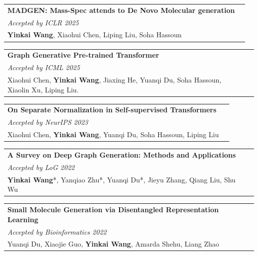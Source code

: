 \documentclass[a4paper,11pt]{article}
\begin{document}
{\begin{tabularx}{\linewidth}{L r}
\textbf{MADGEN: Mass-Spec attends to De Novo Molecular generation} &
\href{https://openreview.net/pdf?id=78tc3EiUrN}{\raisebox{0.0\height}{\footnotesize [PDF]}}\\
\textit{Accepted by ICLR 2025}& \\
{\textbf{Yinkai Wang}, Xiaohui Chen, Liping Liu, Soha Hassoun} & \\
\end{tabularx}

\begin{tabularx}{\linewidth}{L r}
\textbf{Graph Generative Pre-trained Transformer} &
\href{https://proceedings.mlr.press/v267/chen25bl.html}{\raisebox{0.0\height}{\footnotesize [PDF]}}\\
\textit{Accepted by ICML 2025}& \\
{Xiaohui Chen, \textbf{Yinkai Wang}, Jiaxing He, Yuanqi Du, Soha Hassoun, Xiaolin Xu, Liping Liu.} & \\
\end{tabularx}

\begin{tabularx}{\linewidth}{L r}
\textbf{On Separate Normalization in Self-supervised Transformers} &
\href{https://openreview.net/pdf?id=cezKbXsT3V}{\raisebox{0.0\height}{\footnotesize [PDF]}}\\
\textit{Accepted by NeurIPS 2023}& \\
{Xiaohui Chen, \textbf{Yinkai Wang}, Yuanqi Du, Soha Hassoun, Liping Liu} & \\
\end{tabularx}

\begin{tabularx}{\linewidth}{L r}
\textbf{A Survey on Deep Graph Generation: Methods and Applications} &
\href{https://openreview.net/pdf?id=Im8G9R1boQi}{\raisebox{0.0\height}{\footnotesize [PDF]}}\\
\textit{Accepted by LoG 2022}& \\
{\textbf{Yinkai Wang}*, Yanqiao Zhu*, Yuanqi Du*, Jieyu Zhang, Qiang Liu, Shu Wu} & \\
\end{tabularx}

\begin{tabularx}{\linewidth}{L r}
\textbf{Small Molecule Generation via Disentangled Representation Learning} &
\href{https://academic.oup.com/bioinformatics/article-pdf/38/12/3200/49885313/btac296.pdf}{\raisebox{0.0\height}{\footnotesize [PDF]}}\\
\textit{Accepted by Bioinformatics 2022}& \\
{Yuanqi Du, Xiaojie Guo, \textbf{Yinkai Wang}, Amarda Shehu, Liang Zhao} & \\
\end{tabularx}

}
\end{document}
